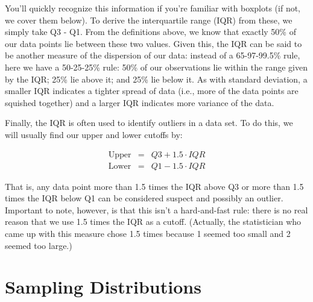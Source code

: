 \begin{glossary}
\term{}{}
\end{glossary}

You'll quickly recognize this information if you're familiar with boxplots (if not, we cover them below). To derive the interquartile range (IQR) from these, we simply take Q3 - Q1. From the definitions above, we know that exactly 50\% of our data points lie between these two values. Given this, the IQR can be said to be another measure of the dispersion of our data: instead of a 65-97-99.5\% rule, here we have a 50-25-25\% rule: 50\% of our observations lie within the range given by the IQR; 25\% lie above it; and 25\% lie below it. As with standard deviation, a smaller IQR indicates a tighter spread of data (i.e., more of the data points are squished together) and a larger IQR indicates more variance of the data.

Finally, the IQR is often used to identify outliers in a data set. To do this, we will usually find our upper and lower cutoffs by:

\begin{eqnarray*}
    \text{Upper} &=& Q3+1.5\cdot IQR \\
    \text{Lower} &=& Q1-1.5\cdot IQR
\end{eqnarray*}

That is, any data point more than 1.5 times the IQR above Q3 or more than 1.5 times the IQR below Q1 can be considered suspect and possibly an outlier. Important to note, however, is that this isn't a hard-and-fast rule: there is no real reason that we use 1.5 times the IQR as a cutoff. (Actually, the statistician who came up with this measure chose 1.5 times because 1 seemed too small and 2 seemed too large.)

\section{Sampling Distributions}

